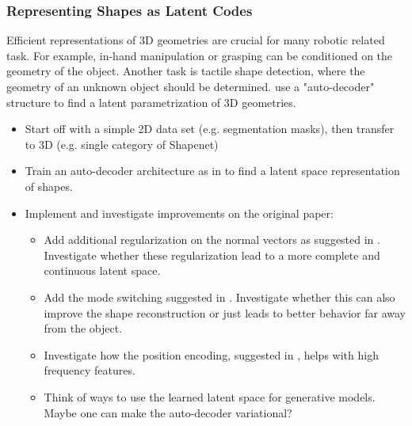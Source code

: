 \documentclass[a4paper]{article}
\begin{document}
\subsubsection{Representing Shapes as Latent Codes}
Efficient representations of 3D geometries are crucial for many robotic related task. 
For example, in-hand manipulation or grasping can be conditioned on the geometry of the object. 
Another task is tactile shape detection, where the geometry of an unknown object should be determined. 
\citet{park2019deepsdf} use a "auto-decoder" structure to find a latent parametrization of 3D geometries.
\begin{itemize}
  \item Start off with a simple 2D data set (e.g. segmentation masks), then transfer to 3D (e.g. single category of Shapenet)
  \item Train an auto-decoder architecture as in \cite{park2019deepsdf} to find a latent space representation of shapes.
  \item Implement and investigate improvements on the original paper:
  \begin{itemize}
    \item Add additional regularization on the normal vectors as suggested in \cite{gropp2020implicit}.
    Investigate whether these regularization lead to a more complete and continuous latent space.
    \item Add the mode switching suggested in \cite{liu2022regularized}. 
    Investigate whether this can also improve the shape reconstruction or just leads to better behavior far away from the object.
    \item Investigate how the position encoding, suggested in \cite{comi2024touchsdf}, helps with high frequency features.
    \item Think of ways to use the learned latent space for generative models. Maybe one can make the auto-decoder variational?
  \end{itemize}
\end{itemize}

\end{document}

